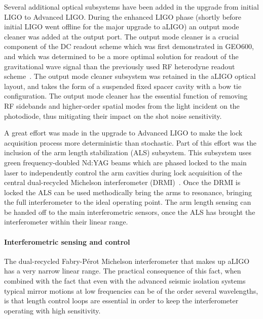 Several additional optical subsystems have been added in the upgrade from initial LIGO to Advanced LIGO. 
During the enhanced LIGO phase (shortly before initial LIGO went offline for the major upgrade to aLIGO) an output
mode cleaner was added at the output port. The output mode cleaner is a crucial component of the DC readout 
scheme which was first demonstrated in GEO600, and which was determined to be a more optimal solution for 
readout of the gravitational wave signal than the previously used RF heterodyne readout scheme~\cite{DCreadout}. The output mode cleaner subsystem was retained in the aLIGO optical layout, and takes the form of a suspended fixed spacer cavity with a bow tie configuration.
The output mode cleaner has the essential function of removing RF sidebands and higher-order spatial modes from the light incident on the photodiode, thus mitigating their impact on the shot noise sensitivity. 

A great effort was made in the upgrade to Advanced LIGO to make the lock acquisition process more deterministic than stochastic.
Part of this effort was the inclusion of the arm length stabilization (ALS) subsystem.
This subsystem uses green frequency-doubled Nd:YAG beams which are phased locked to the main laser to independently control the arm cavities during lock acquisition of the central dual-recycled Michelson interferometer (DRMI)~\cite{Staley2014}.
Once the DRMI is locked the ALS can be used methodically bring the arms to resonance, bringing the full interferometer to the ideal operating point. 
The arm length sensing can be handed off to the main interferometric sensors, once the ALS has brought the interferometer within their linear range.

\paragraph*{Interferometric sensing and control}
The dual-recycled Fabry-P\'{e}rot Michelson interferometer that makes up aLIGO has a very narrow linear range. 
The practical consequence of this fact, when combined with the fact that even with the advanced seismic isolation systems typical 
mirror motions at low frequencies can be of the order several wavelengths, is that length control loops are essential in order 
to keep the interferometer operating with high sensitivity. 

